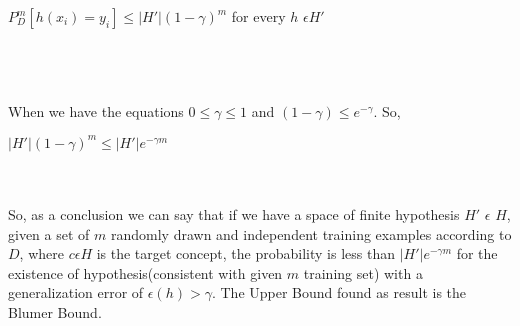 \documentclass[12pt,letterpaper]{article}
\begin{document}
\begin{center} $P^{m}_D[h(x_i) = y_i] \leq |H'|(1-\gamma)^{m}$ for every $h$  $\epsilon H'$\end{center}    \\\\ \\
When we have the equations $0 \leq \gamma \leq 1$ and  $(1-\gamma) \leq e^{-\gamma}$. So, 
\begin{center} $|H'|(1- \gamma)^{m} \leq |H'|e^{-\gamma m}$ \end{center} \\\\
So, as a conclusion we can say that if we have a space of finite hypothesis $H'$ $\epsilon$ $H$, given a set of $m$ randomly drawn and independent training examples according to $D$, where $c \epsilon H$ is the target concept, the probability is less than $|H'|e^{-\gamma m}$ for the existence of hypothesis(consistent with given $m$ training set) with a generalization error of $\epsilon (h) > \gamma$. The Upper Bound found as result is the Blumer Bound.
\end{document}
